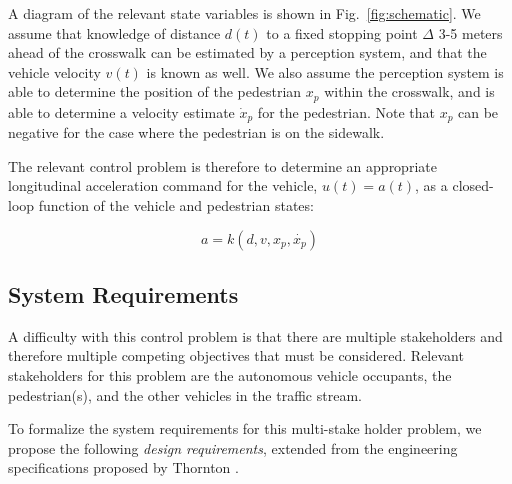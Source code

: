 \documentclass[letterpaper, 10 pt, conference]{ieeeconf} %
\begin{document}
A diagram of the relevant state variables is shown in Fig.~\ref{fig:schematic}. We assume that knowledge of distance $d(t)$ to a fixed stopping point $\Delta$ 3-5 meters ahead of the crosswalk can be estimated by a perception system, and that the vehicle velocity $v(t)$ is known as well. We also assume the perception system is able to determine the position of the pedestrian $x_p$ within the crosswalk, and is able to determine a velocity estimate $\dot{x}_p$ for the pedestrian. Note that $x_p$ can be negative for the case where the pedestrian is on the sidewalk. 


The relevant control problem is therefore to determine an appropriate longitudinal acceleration command for the vehicle, $u(t) = a(t)$, as a closed-loop function of the vehicle and pedestrian states:

\begin{equation}
a = k(d, v, x_p, \dot{x_p})
\end{equation}



\subsection{System Requirements}

A difficulty with this control problem is that there are multiple stakeholders and therefore multiple competing objectives that must be considered. Relevant stakeholders for this problem are the autonomous vehicle occupants, the pedestrian(s), and the other vehicles in the traffic stream. 

To formalize the system requirements for this multi-stake holder problem, we propose the following \textit{design requirements}, extended from the engineering specifications proposed by Thornton \cite{Thornton2018}. 
\end{document}
